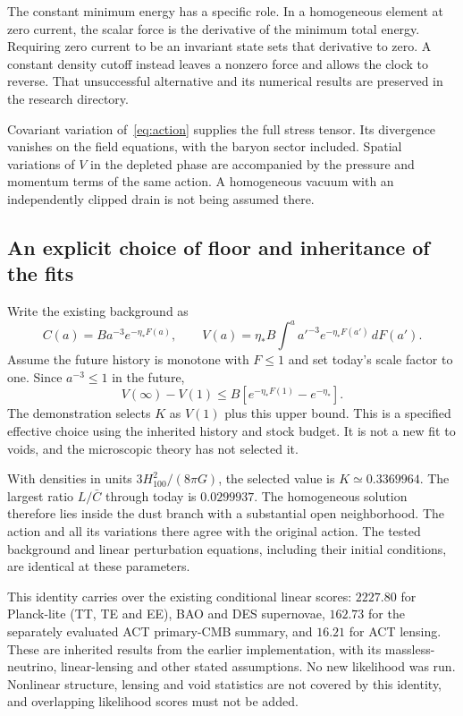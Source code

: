 \documentclass[11pt]{article}
\begin{document}
The constant minimum energy has a specific role. In a homogeneous element
at zero current, the scalar force is the derivative of the minimum total
energy. Requiring zero current to be an invariant state sets that derivative
to zero. A constant density cutoff instead leaves a nonzero force and allows
the clock to reverse. That unsuccessful alternative and its numerical
results are preserved in the research directory.

Covariant variation of~\eqref{eq:action} supplies the full stress tensor.
Its divergence vanishes on the field equations, with the baryon sector
included. Spatial variations of $V$ in the depleted phase are accompanied
by the pressure and momentum terms of the same action. A homogeneous vacuum
with an independently clipped drain is not being assumed there.

\subsection{An explicit choice of floor and inheritance of the fits}
Write the existing background as
\begin{equation}
 C(a)=B a^{-3}e^{-\eta_*F(a)},\qquad
 V(a)=\eta_* B\int^a a'^{-3}e^{-\eta_*F(a')}\,dF(a').
\end{equation}
Assume the future history is monotone with $F\le1$ and set today's scale
factor to one. Since $a^{-3}\le1$ in the future,
\begin{equation}
 V(\infty)-V(1)\le B[e^{-\eta_*F(1)}-e^{-\eta_*}].
\end{equation}
The demonstration selects $K$ as $V(1)$ plus this upper bound. This is a
specified effective choice using the inherited history and stock budget.
It is not a new fit to voids, and the microscopic theory has not selected it.

With densities in units $3H_{100}^2/(8\pi G)$, the selected value is
$K\simeq0.3369964$. The largest ratio $L/\bar C$ through today is
$0.0299937$. The homogeneous solution therefore lies inside the dust
branch with a substantial open neighborhood. The action and all its
variations there agree with the original action. The tested background and
linear perturbation equations, including their initial conditions, are
identical at these parameters.

This identity carries over the existing conditional linear scores:
$2227.80$ for Planck-lite (TT, TE and EE), BAO and DES supernovae, $162.73$ for the separately
evaluated ACT primary-CMB summary, and $16.21$ for ACT lensing. These are
inherited results from the earlier implementation, with its massless-neutrino,
linear-lensing and other stated assumptions. No new likelihood was run.
Nonlinear structure, lensing and void statistics are not covered by this
identity, and overlapping likelihood scores must not be added.
\end{document}
